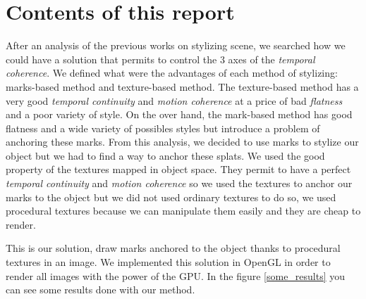 \section{Contents of this report}

After an analysis of the previous works on stylizing scene, we searched how we could have a solution that permits to control the 3 axes of the \textit{temporal coherence}. We defined what were the advantages of each method of stylizing: marks-based method and texture-based method. The texture-based method has a very good \textit{temporal continuity} and \textit{motion coherence} at a price of bad \textit{flatness} and a poor variety of style. On the over hand, the mark-based method has good flatness and a wide variety of possibles styles but introduce a problem of anchoring these marks. From this analysis, we decided to use marks to stylize our object but we had to find a way to anchor these splats. We used the good property of the textures mapped in object space. They permit to have a perfect \textit{temporal continuity} and \textit{motion coherence} so we used the textures to anchor our marks to the object but we did not used ordinary textures to do so, we used procedural textures because we can manipulate them easily and they are cheap to render. \newline

This is our solution, draw marks anchored to the object thanks to procedural textures in an image. We implemented this solution in OpenGL in order to render all images with the power of the GPU. In the figure \ref{some_results} you can see some results done with our method.

